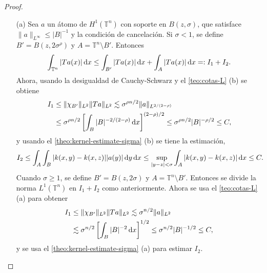 \begin{proof}
	\begin{itemize}
		\item[(a)] Sea $a$ un átomo de $H^1(\mathbb{T}^n)$ con soporte en $B(z, \sigma)$, que satisface $\|a\|_{L^\infty}\leq |B|^{-1}$ y la condición de cancelación. Si $\sigma < 1$, se define $B'=B(z, 2\sigma^\rho)$ y $A = \mathbb{T}^n\setminus B'$. Entonces 
		\begin{equation*}
			\int_{\mathbb{T}^n}|Ta(x)|\mathop{}\!\mathrm{d} x \leq \int_{B'}|Ta(x)|\mathop{}\!\mathrm{d} x  + \int_{A}|Ta(x)|\mathop{}\!\mathrm{d} x =: I_1 + I_2.
		\end{equation*}
		Ahora, usando la desigualdad de Cauchy-Schwarz y el \cref{teo:cotas-L} (b) se obtiene 
		\begin{align*}
			I_1  &\leq \|\chi_{B'}\|_{L^2}\|Ta\|_{{L^2}}\lesssim \sigma^{\rho n/2}\|a\|_{L^{2/(2-\rho)}} \\ 
			 &\leq  \sigma^{\rho n/2} \left[ \int_B |B|^{-2/(2-\rho)}\mathop{}\!\mathrm{d} x\right]^{(2-\rho)/2} 
			\leq  \sigma^{\rho n/2}|B|^{-\rho/2} \leq C,
		\end{align*}
		y usando el \cref{theo:kernel-estimate-sigma} (b) se tiene la estimación,
		\begin{equation*}
			I_2 \leq \int_A\int_B |k(x, y) - k(x, z)||a(y)|\mathop{}\!\mathrm{d} y \mathop{}\!\mathrm{d} x \leq \sup_{|y-z|<\sigma}\int_A|k(x,y)-k(x, z)|\mathop{}\!\mathrm{d} x \leq C.
		\end{equation*}
		Cuando $\sigma \geq 1$, se define $B'=B(z, 2\sigma)$ y $A = \mathbb{T}^n\setminus B'$. Entonces se divide la norma $L^1(\mathbb{T}^n)$ en $I_1 + I_2$ como anteriormente. Ahora se usa el \cref{teo:cotas-L} (a) para obtener
		\begin{align*}
			I_1  &\leq \|\chi_{B'}\|_{L^2}\|Ta\|_{{L^2}}\lesssim\sigma^{ n/2}\|a\|_{L^{2}} \\ 
			 & \lesssim \sigma^{ n/2} \left[ \int_B |B|^{-2}\mathop{}\!\mathrm{d} x\right]^{1/2}  \leq \sigma^{n/2}|B|^{-1/2}\leq C,
		\end{align*}
		y se usa el \cref{theo:kernel-estimate-sigma} (a) para estimar $I_2$.\\
		

\end{itemize}
\end{proof}
